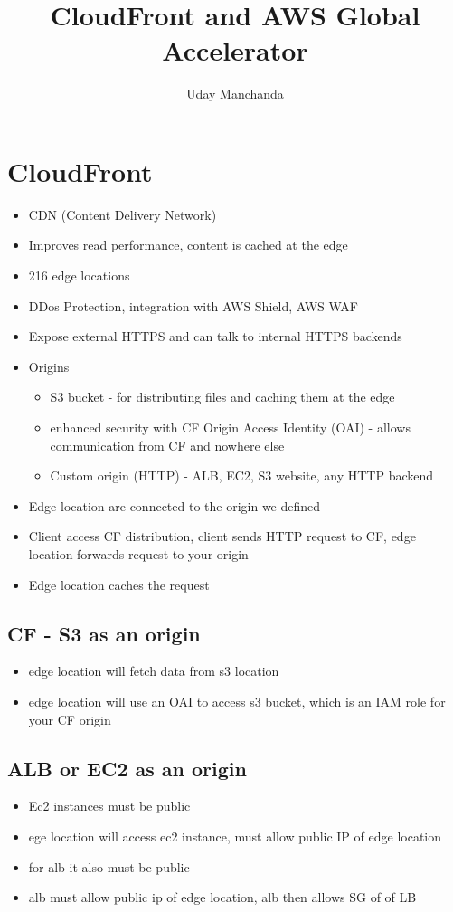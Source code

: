 \documentclass[]{scrartcl}
\title{CloudFront and AWS Global Accelerator}
\author{Uday Manchanda}
\begin{document}
\maketitle

\section{CloudFront}

\begin{itemize}
	\item CDN (Content Delivery Network)
	\item Improves read performance, content is cached at the edge
	\item 216 edge locations
	\item DDos Protection, integration with AWS Shield, AWS WAF
	\item Expose external HTTPS and can talk to internal HTTPS backends
	\item Origins
	\begin{itemize}
		\item S3 bucket - for distributing files and caching them at the edge
		\item enhanced security with CF Origin Access Identity (OAI) - allows communication from CF and nowhere else
		\item Custom origin (HTTP) - ALB, EC2, S3 website, any HTTP backend
	\end{itemize}
	\item Edge location are connected to the origin we defined
	\item Client access CF distribution, client sends HTTP request to CF, edge location forwards request to your origin
	\item Edge location caches the request
\end{itemize}

\subsection{CF - S3 as an origin}
\begin{itemize}
	\item edge location will fetch data from s3 location
	\item edge location will use an OAI to access s3 bucket, which is an IAM role for your CF origin
\end{itemize}

\subsection{ALB or EC2 as an origin}
\begin{itemize}
	\item Ec2 instances must be public
	\item ege location will access ec2 instance, must allow public IP of edge location
	\item for alb it also must be public
	\item alb must allow public ip of edge location, alb then allows SG of of LB
\end{itemize}
\end{document}
